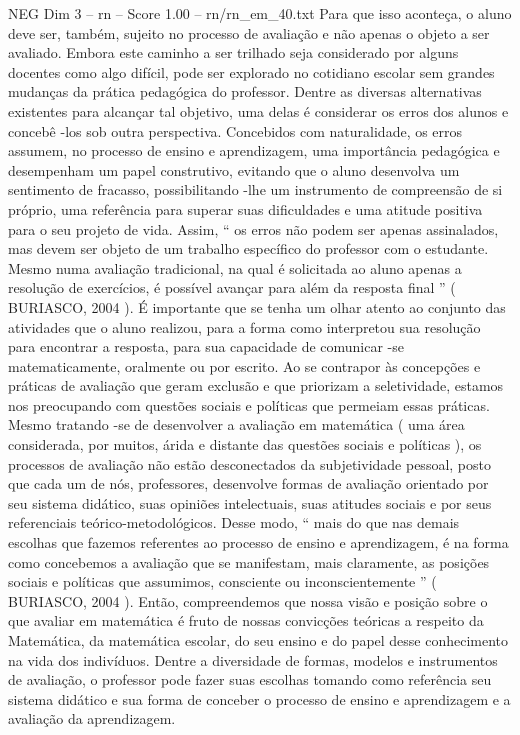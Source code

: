 \begin{textsample}{NEG Dim 3 – rn – Score 1.00 – rn/rn\_em\_40.txt}
Para que isso aconteça, o aluno deve ser, também, sujeito no processo de avaliação e não apenas o objeto a ser avaliado.
Embora este caminho a ser trilhado seja considerado por alguns docentes como algo difícil, pode ser explorado no cotidiano escolar sem grandes mudanças da prática pedagógica do professor.
Dentre as diversas alternativas existentes para alcançar tal objetivo, uma delas é considerar os erros dos alunos e concebê -los sob outra perspectiva.
Concebidos com naturalidade, os erros assumem, no processo de ensino e aprendizagem, uma importância pedagógica e desempenham um papel construtivo, evitando que o aluno desenvolva um sentimento de fracasso, possibilitando -lhe um instrumento de compreensão de si próprio, uma referência para superar suas dificuldades e uma atitude positiva para o seu projeto de vida.
Assim, “ os erros não podem ser apenas assinalados, mas devem ser objeto de um trabalho específico do professor com o estudante.
Mesmo numa avaliação tradicional, na qual é solicitada ao aluno apenas a resolução de exercícios, é possível avançar para além da resposta final ” ( BURIASCO, 2004 ).
É importante que se tenha um olhar atento ao conjunto das atividades que o aluno realizou, para a forma como interpretou sua resolução para encontrar a resposta, para sua capacidade de comunicar -se matematicamente, oralmente ou por escrito.
Ao se contrapor às concepções e práticas de avaliação que geram exclusão e que priorizam a seletividade, estamos nos preocupando com questões sociais e políticas que permeiam essas práticas.
Mesmo tratando -se de desenvolver a avaliação em matemática ( uma área considerada, por muitos, árida e distante das questões sociais e políticas ), os processos de avaliação não estão desconectados da subjetividade pessoal, posto que cada um de nós, professores, desenvolve formas de avaliação orientado por seu sistema didático, suas opiniões intelectuais, suas atitudes sociais e por seus referenciais teórico-metodológicos.
Desse modo, “ mais do que nas demais escolhas que fazemos referentes ao processo de ensino e aprendizagem, é na forma como concebemos a avaliação que se manifestam, mais claramente, as posições sociais e políticas que assumimos, consciente ou inconscientemente ” ( BURIASCO, 2004 ).
Então, compreendemos que nossa visão e posição sobre o que avaliar em matemática é fruto de nossas convicções teóricas a respeito da Matemática, da matemática escolar, do seu ensino e do papel desse conhecimento na vida dos indivíduos.
Dentre a diversidade de formas, modelos e instrumentos de avaliação, o professor pode fazer suas escolhas tomando como referência seu sistema didático e sua forma de conceber o processo de ensino e aprendizagem e a avaliação da aprendizagem.

\end{textsample}
